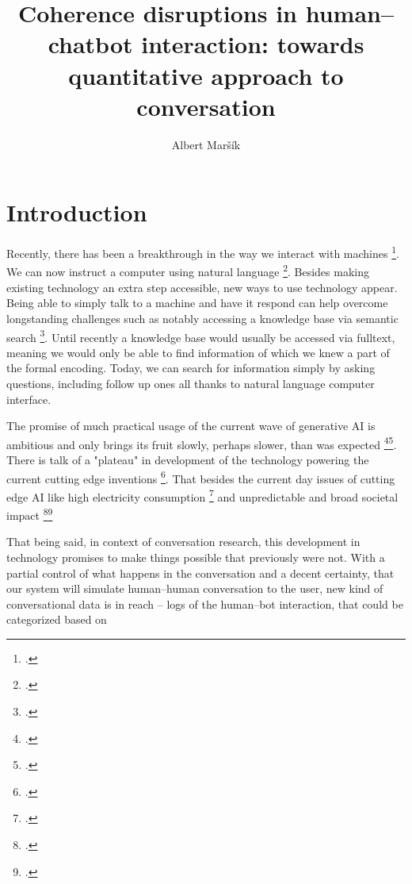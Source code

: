 \documentclass[12pt]{report}
\title{Coherence disruptions in human–chatbot interaction: towards quantitative approach to conversation}
\date{}
\author{Albert Maršík}
\begin{document}


\maketitle
\clearpage
\tableofcontents
\clearpage



\chapter*{Introduction}

\par
Recently, there has been a breakthrough in the way we interact with machines \footcite{sharma2024exploring}.
We can now instruct a computer using natural language \footcite{hendrix1982natural}.
Besides making existing technology an extra step accessible,
new ways to use technology appear.
Being able to simply talk to a machine and have it respond
can help overcome longstanding challenges
such as notably accessing a knowledge base via semantic search \footcite{makela2005survey}.
Until recently a knowledge base would usually be accessed via fulltext,
meaning we would only be able to find
information of which we knew a part of the formal encoding.
Today, we can search for information simply by asking questions,
including follow up ones
all thanks to natural language computer interface.
\par
The promise of much practical usage of the current wave of generative AI is ambitious
and only brings its fruit slowly, perhaps slower, than was expected
\footcite{bloomberg2024openai1}\footcite{reuters2024openai}.
There is talk of a "plateau" in development of the technology powering
the current cutting edge inventions \footcite{ritter2024ai}.
That besides the current day issues of cutting edge AI like
high electricity consumption \footcite{ritchie2024ai} and
unpredictable and broad societal impact \footcite{hagerty2019global}\footcite{baldassarre2023social}

That being said, in context of conversation research,
this development in technology promises to make things possible that previously were not.
With a partial control of what happens in the conversation and a decent certainty, that
our system will simulate human–human conversation to the user,
new kind of conversational data is in reach –
logs of the human–bot interaction, that could be categorized based on
\end{document}
